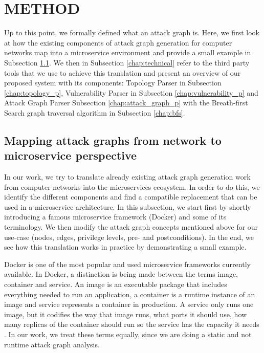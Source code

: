 \section{METHOD}
\label{chap:method}

Up to this point, we formally defined what an attack graph is. Here, we first look at how the existing components of attack graph generation for computer networks map into a microservice environment and provide a small example in Subsection \ref{chap:mapping}. We then in Subsection \ref{chap:technical} refer to the third party tools that we use to achieve this translation and present an overview of our proposed system with its components: Topology Parser in Subsection \ref{chap:topology_p}, Vulnerability Parser in Subsection \ref{chap:vulnerability_p} and Attack Graph Parser Subsection \ref{chap:attack_graph_p} with the Breath-first Search graph traversal algorithm in Subsection \ref{chap:bfs}. 

\subsection{Mapping attack graphs from network to microservice perspective}
\label{chap:mapping}

In our work, we try to translate already existing attack graph generation work from computer networks into the microservices ecosystem. In order to do this, we identify the different components and find a compatible replacement that can be used in a microservice architecture. In this subsection, we start first by shortly introducing a famous microservice framework (Docker) and some of its terminology. We then modify the attack graph concepts mentioned above for our use-case (nodes, edges, privilege levels, pre- and postconditions). In the end, we see how this translation works in practice by demonstrating a small example.

Docker is one of the most popular and used microservice frameworks currently available. In Docker, a distinction is being made between the terms image, container and service. An image is an executable package that includes everything needed to run an application, a container is a runtime instance of an image and service represents a container in production. A service only runs one image, but it codifies the way that image runs, what ports it should use, how many replicas of the container should run so the service has the capacity it needs \cite{merkel2014docker}. In our work, we treat these terms equally, since we are doing a static and not runtime attack graph analysis.

